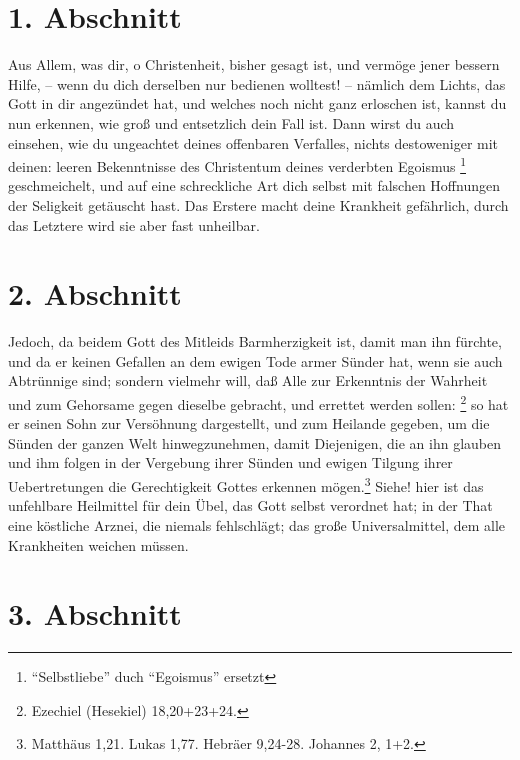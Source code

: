 \section{1. Abschnitt}

Aus Allem, was dir, o Christenheit, bisher gesagt ist, und vermöge jener bessern
Hilfe, -- wenn du dich derselben nur bedienen wolltest! -- nämlich dem Lichts,
das Gott in dir angezündet hat, und welches noch nicht ganz erloschen ist,
kannst du nun erkennen, wie groß und entsetzlich dein Fall ist. Dann wirst du
auch einsehen, wie du ungeachtet deines offenbaren Verfalles, nichts
destoweniger mit deinen: leeren Bekenntnisse des Christentum deines verderbten
Egoismus \footnote{``Selbstliebe'' duch ``Egoismus'' ersetzt} geschmeichelt, 
und auf eine schreckliche Art dich selbst mit
falschen Hoffnungen der Seligkeit getäuscht hast. Das Erstere macht deine
Krankheit gefährlich, durch das Letztere wird sie aber fast unheilbar.

\section{2. Abschnitt}

Jedoch, da beidem Gott des Mitleids Barmherzigkeit ist, damit man ihn
fürchte, und da er keinen Gefallen an dem ewigen Tode armer Sünder hat, wenn
sie auch Abtrünnige sind; sondern vielmehr will, daß Alle zur Erkenntnis der
Wahrheit und zum Gehorsame gegen dieselbe gebracht, und errettet werden
sollen: \footnote{Ezechiel (Hesekiel) 18,20+23+24.}
 so hat er seinen Sohn zur Versöhnung
dargestellt, und zum Heilande gegeben, um die Sünden der ganzen Welt
hinwegzunehmen, damit Diejenigen, die an ihn glauben und ihm folgen in der
Vergebung ihrer Sünden und ewigen Tilgung ihrer Uebertretungen die
Gerechtigkeit Gottes erkennen mögen.\footnote{Matthäus 1,21. Lukas 1,77. Hebräer
9,24-28. Johannes 2, 1+2.}
 
Siehe! hier ist das unfehlbare Heilmittel für dein
Übel, das Gott selbst verordnet hat; in der That eine köstliche Arznei, die
niemals fehlschlägt; das große Universalmittel, dem alle Krankheiten weichen
müssen.

\section{3. Abschnitt}

